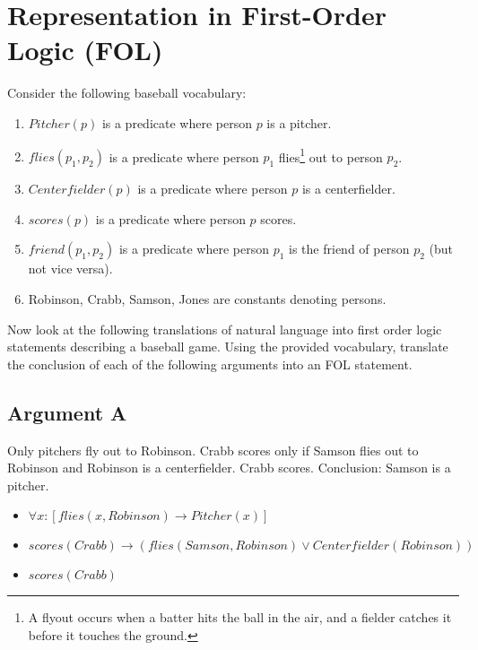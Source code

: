 \section{Representation in First-Order Logic (FOL)}
\begin{large}
    Consider the following baseball vocabulary:
    \begin{enumerate}
        \item $Pitcher(p)$ is a predicate where person $p$ is a pitcher.
        \item $flies(p_1, p_2)$ is a predicate where person $p_1$ flies\footnote{A flyout occurs when a batter hits the ball in the air, and a fielder catches it before it touches the ground.} out to person $p_2$.
        \item $Centerfielder(p)$ is a predicate where person $p$ is a centerfielder.
        \item $scores(p)$ is a predicate where person $p$ scores.
        \item $friend(p_1, p_2)$ is a predicate where person $p_1$ is the friend of person $p_2$ (but not vice versa).
        \item Robinson, Crabb, Samson, Jones are constants denoting persons.
    \end{enumerate}
    Now look at the following translations of natural language into first order logic statements describing
    a baseball game. Using the provided vocabulary, translate the conclusion of each of the
    following arguments into an FOL statement.
\end{large}

\subsection{Argument A}
\begin{large}
    Only pitchers fly out to Robinson. Crabb scores only if Samson flies out to Robinson and Robinson is a
    centerfielder. Crabb scores.
    Conclusion: Samson is a pitcher.\
    \begin{itemize}
        \item $\forall x : [flies(x, Robinson) \rightarrow P itcher(x)]$
        \item $scores(Crabb) \rightarrow (flies(Samson, Robinson) \lor Centerf ielder(Robinson))$
        \item $scores(Crabb)$
    \end{itemize}

\end{large}


